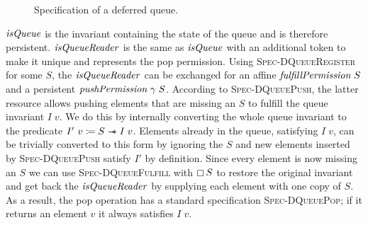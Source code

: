 \begin{figure}[ht]
  \caption{Specification of a deferred queue.}
  \label{fig:dm-deferred-spec}
\end{figure}

\(\mathit{isQueue}{}\) is the invariant containing the state of the queue and is therefore persistent.
\(\mathit{isQueueReader}{}\) is the same as \(\mathit{isQueue}{}\) with an additional token to make it unique and represents the pop permission.
Using \textsc{Spec-DQueueRegister} for some \(S\), the \(\mathit{isQueueReader}{}\) can be exchanged for an affine \(\mathit{fulfillPermission}{}\; S\) and a persistent \(\mathit{pushPermission}{}\; \gamma\; S\).
According to \textsc{Spec-DQueuePush}, the latter resource allows pushing elements that are missing an \(S\) to fulfill the queue invariant \(I\; v\).
We do this by internally converting the whole queue invariant to the predicate \(I'~v \coloneq S \mathrel{-\!\!\ast} I\; v\).
Elements already in the queue, satisfying \(I\; v\), can be trivially converted to this form by ignoring the \(S\) and new elements inserted by \textsc{Spec-DQueuePush} satisfy \(I'\) by definition.
Since every element is now missing an \(S\) we can use \textsc{Spec-DQueueFulfill} with \(\mathop{\boxempty} S\) to restore the original invariant and get back the \(\mathit{isQueueReader}{}\) by supplying each element with one copy of \(S\).
As a result, the pop operation has a standard specification \textsc{Spec-DQueuePop}; if it returns an element \(v\) it always satisfies \(I\; v\).

